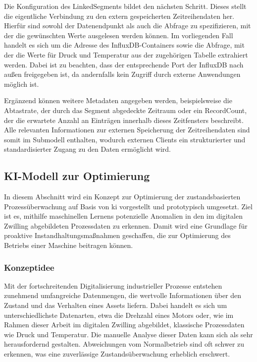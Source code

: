Die Konfiguration des LinkedSegments bildet den nächsten Schritt.
Dieses stellt die eigentliche Verbindung zu den extern gespeicherten Zeitreihendaten her. 
Hierfür sind sowohl der Datenendpunkt als auch die Abfrage zu spezifizieren, mit der die gewünschten Werte ausgelesen werden können. 
Im vorliegenden Fall handelt es sich um die Adresse des InfluxDB-Containers sowie die Abfrage, mit der die Werte für Druck und Temperatur aus der zugehörigen Tabelle extrahiert werden. 
Dabei ist zu beachten, dass der entsprechende Port der InfluxDB nach außen freigegeben ist, da andernfalls kein Zugriff durch externe Anwendungen möglich ist.

Ergänzend können weitere Metadaten angegeben werden, beispielsweise die Abtastrate, der durch das Segment abgedeckte Zeitraum oder ein RecordCount, der die erwartete Anzahl an Einträgen innerhalb dieses Zeitfensters beschreibt.
Alle relevanten Informationen zur externen Speicherung der Zeitreihendaten sind somit im Submodell enthalten, wodurch externen Clients ein strukturierter und standardisierter Zugang zu den Daten ermöglicht wird.

\newpage
\subsection{KI-Modell zur Optimierung}
In diesem Abschnitt wird ein Konzept zur Optimierung der zustandsbasierten Prozessüberwachung auf Basis von \acs{ki} vorgestellt und prototypisch umgesetzt.
Ziel ist es, mithilfe maschinellen Lernens potenzielle Anomalien in den im digitalen Zwilling abgebildeten Prozessdaten zu erkennen.
Damit wird eine Grundlage für proaktive Instandhaltungsmaßnahmen geschaffen, die zur Optimierung des Betriebs einer Maschine beitragen können.



\subsubsection{Konzeptidee}
Mit der fortschreitenden Digitalisierung industrieller Prozesse entstehen zunehmend umfangreiche Datenmengen, die wertvolle Informationen über den Zustand und das Verhalten eines Assets liefern. 
Dabei handelt es sich um unterschiedlichste Datenarten, etwa die Drehzahl eines Motors oder, wie im Rahmen dieser Arbeit im digitalen Zwilling abgebildet, klassische Prozessdaten wie Druck und Temperatur.
Die manuelle Analyse dieser Daten kann sich als sehr herausfordernd gestalten. Abweichungen vom Normalbetrieb sind oft schwer zu erkennen, was eine zuverlässige Zustandsüberwachung erheblich erschwert.

